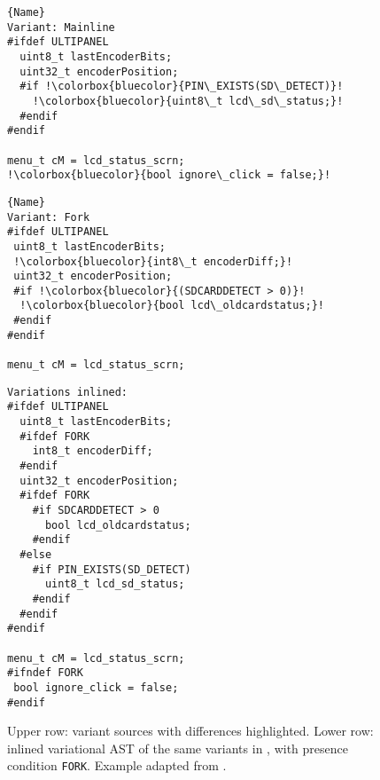 \begin{figure}[t]%
\centering
\noindent\begin{minipage}{.40\textwidth}
\begin{lstlisting}[escapechar=!]{Name}
Variant: Mainline
#ifdef ULTIPANEL
  uint8_t lastEncoderBits;
  uint32_t encoderPosition;
  #if !\colorbox{bluecolor}{PIN\_EXISTS(SD\_DETECT)}!
    !\colorbox{bluecolor}{uint8\_t lcd\_sd\_status;}!
  #endif
#endif

menu_t cM = lcd_status_scrn;
!\colorbox{bluecolor}{bool ignore\_click = false;}!
\end{lstlisting}
\end{minipage}\qquad
\begin{minipage}{.40\textwidth}
\begin{lstlisting}[escapechar=!]{Name}
Variant: Fork
#ifdef ULTIPANEL
 uint8_t lastEncoderBits;
 !\colorbox{bluecolor}{int8\_t encoderDiff;}!
 uint32_t encoderPosition;
 #if !\colorbox{bluecolor}{(SDCARDDETECT > 0)}!
  !\colorbox{bluecolor}{bool lcd\_oldcardstatus;}!
 #endif
#endif

menu_t cM = lcd_status_scrn;
\end{lstlisting}
\end{minipage}
\vspace{5mm}

\begin{minipage}{.40\textwidth}
\begin{lstlisting}[escapechar=!]
Variations inlined:
#ifdef ULTIPANEL
  uint8_t lastEncoderBits;
  #ifdef FORK
    int8_t encoderDiff;
  #endif
  uint32_t encoderPosition;
  #ifdef FORK
    #if SDCARDDETECT > 0
      bool lcd_oldcardstatus;
    #endif
  #else
    #if PIN_EXISTS(SD_DETECT)
      uint8_t lcd_sd_status;
    #endif
  #endif
#endif

menu_t cM = lcd_status_scrn;
#ifndef FORK
 bool ignore_click = false;
#endif
\end{lstlisting}
\end{minipage}

    \caption{Upper row: variant sources with differences highlighted. Lower row: inlined variational AST of the same variants in \tooln, with presence condition \texttt{FORK}. Example adapted from \cite{lillack2017intentions}.}
    \label{fig:incline-ast}
\end{figure}

